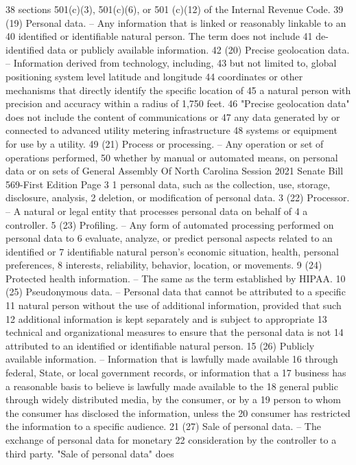 38 sections 501(c)(3), 501(c)(6), or 501 (c)(12) of the Internal Revenue Code.
39 (19) Personal data. – Any information that is linked or reasonably linkable to an
40 identified or identifiable natural person. The term does not include
41 de-identified data or publicly available information.
42 (20) Precise geolocation data. – Information derived from technology, including,
43 but not limited to, global positioning system level latitude and longitude
44 coordinates or other mechanisms that directly identify the specific location of
45 a natural person with precision and accuracy within a radius of 1,750 feet.
46 "Precise geolocation data" does not include the content of communications or
47 any data generated by or connected to advanced utility metering infrastructure
48 systems or equipment for use by a utility.
49 (21) Process or processing. – Any operation or set of operations performed,
50 whether by manual or automated means, on personal data or on sets of 
General Assembly Of North Carolina Session 2021
Senate Bill 569-First Edition Page 3
1 personal data, such as the collection, use, storage, disclosure, analysis,
2 deletion, or modification of personal data.
3 (22) Processor. – A natural or legal entity that processes personal data on behalf of
4 a controller.
5 (23) Profiling. – Any form of automated processing performed on personal data to
6 evaluate, analyze, or predict personal aspects related to an identified or
7 identifiable natural person's economic situation, health, personal preferences,
8 interests, reliability, behavior, location, or movements.
9 (24) Protected health information. – The same as the term established by HIPAA.
10 (25) Pseudonymous data. – Personal data that cannot be attributed to a specific
11 natural person without the use of additional information, provided that such
12 additional information is kept separately and is subject to appropriate
13 technical and organizational measures to ensure that the personal data is not
14 attributed to an identified or identifiable natural person.
15 (26) Publicly available information. – Information that is lawfully made available
16 through federal, State, or local government records, or information that a
17 business has a reasonable basis to believe is lawfully made available to the
18 general public through widely distributed media, by the consumer, or by a
19 person to whom the consumer has disclosed the information, unless the
20 consumer has restricted the information to a specific audience.
21 (27) Sale of personal data. – The exchange of personal data for monetary
22 consideration by the controller to a third party. "Sale of personal data" does
